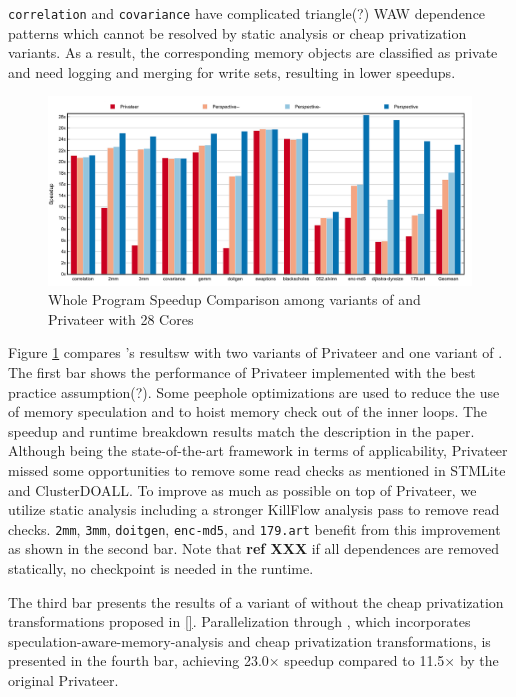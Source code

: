 \texttt{correlation} and \texttt{covariance} have complicated triangle(?) WAW
dependence patterns which cannot be resolved by static analysis or cheap
privatization variants. As a result, the corresponding memory objects are
classified as private and need logging and merging for write sets,
resulting in lower speedups.

\begin{figure}[ht]
  \includegraphics[width=\textwidth]{figures/compare-privateer}
  \caption{Whole Program Speedup Comparison among variants of \name and Privateer with 28 Cores}
  \label{fig:speedup-compare}
\end{figure}

Figure \ref{fig:speedup-compare} compares \namensp's resultsw
 with two
variants of Privateer and one variant of \namensp. The first bar shows the
performance of Privateer implemented with the best practice assumption(?).
Some peephole optimizations are used to reduce the use of memory
speculation and to hoist memory check out of the inner loops. The speedup
and runtime breakdown results match the description in the paper. Although
being the state-of-the-art framework in terms of applicability, Privateer
missed some opportunities to remove some read checks as mentioned in
STMLite\cite{mehrara:09:stmlite} and ClusterDOALL\cite{kim:12:cgo}. To
improve as much as possible on top of Privateer, we utilize static analysis
including a stronger KillFlow analysis pass to remove read checks.
\texttt{2mm}, \texttt{3mm}, \texttt{doitgen}, \texttt{enc-md5}, and
\texttt{179.art} benefit from this improvement as shown in the second bar.
Note that \textbf{ref XXX} if all dependences are removed statically, no
checkpoint is needed in the runtime.

The third bar presents the results of a variant of \name without the cheap
privatization transformations proposed in \ref{}. Parallelization through
\name, which incorporates speculation-aware-memory-analysis and cheap
privatization transformations, is presented in the fourth bar, achieving
23.0$\times$ speedup compared to 11.5$\times$ by the original Privateer.


